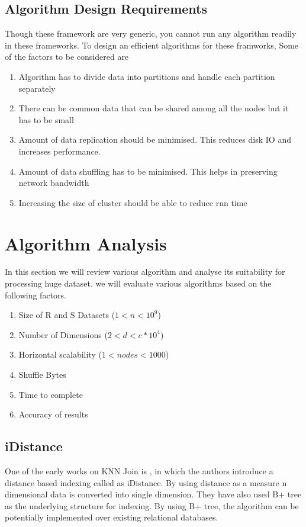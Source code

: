 \documentclass[conference]{IEEEtran}
\begin{document}
\subsection{Algorithm Design Requirements}

Though these framework are very generic, you cannot run any algorithm
readily in these frameworks. To design an efficient algorithms for these framworks,
Some of the factors to be considered are

\medskip

\begin{enumerate}
\item Algorithm has to divide data into partitions and handle each partition
  separately
\item There can be common data that can be shared among all the nodes
  but it has to be small
\item Amount of data replication should be minimised. This reduces
  disk IO and increases performance.
\item Amount of data shuffling has to be minimised. This helps in
  preserving network bandwidth
\item Increasing the size of cluster should be able to reduce run time
\end{enumerate}


\section{Algorithm Analysis}
In this section we will review various algorithm and analyse its
suitability for processing huge dataset. we will evaluate various
algorithms based on the following factors.
\begin{enumerate}
\item Size of R and S Datasets ($1 < n < 10^9$)
\item Number of Dimensions ($2 < d < c*10^4$)
\item Horizontal scalability ($1 < nodes < 1000$)
\item Shuffle Bytes
\item Time to complete
\item Accuracy of results
\end{enumerate}

\bigskip
\subsection{iDistance}
One of the early works on KNN Join is \cite{jagadish_idistance:_2005}, in which the authors
introduce a distance based indexing called as iDistance. By using
distance as a measure n dimensional data is converted into single
dimension. They have also used B+ tree as the underlying structure for indexing. By using B+ tree, the
algorithm can be potentially implemented over existing relational databases.
\end{document}
